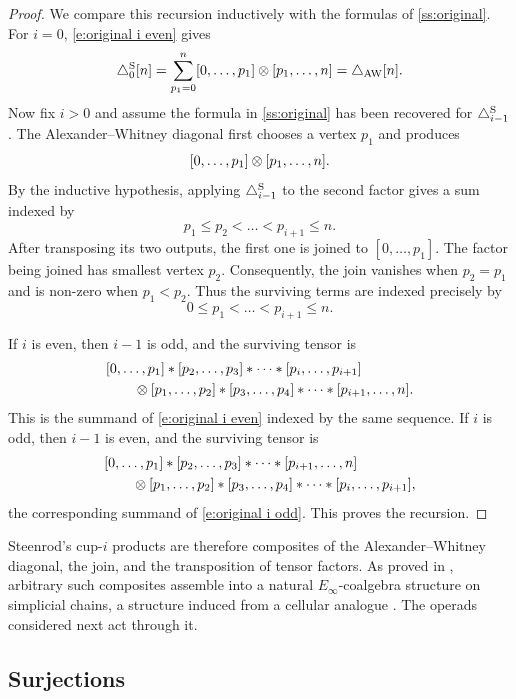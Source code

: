 \begin{proof}
	We compare this recursion inductively with the formulas of \cref{ss:original}.
	For $i=0$, \cref{e:original i even} gives
	\[
		\triangle^{\mathrm{S}}_0[n]
		=
		\sum_{p_1=0}^{n}
		[0,\dots,p_1] \otimes [p_1,\dots,n]
		=
		\triangle_{{\mathrm{AW}}}[n].
	\]
	Now fix $i>0$ and assume the formula in \cref{ss:original} has been recovered for $\triangle^{\mathrm{S}}_{i-1}$.
	The Alexander--Whitney diagonal first chooses a vertex $p_1$ and produces
	\[
		[0,\dots,p_1] \otimes [p_1,\dots,n].
	\]
	By the inductive hypothesis, applying $\triangle^{\mathrm{S}}_{i-1}$ to the second factor gives a sum indexed by
	\[
		p_1 \leq p_2 < \dots < p_{i+1} \leq n.
	\]
	After transposing its two outputs, the first one is joined to $[0,\dots,p_1]$.
	The factor being joined has smallest vertex $p_2$.
	Consequently, the join vanishes when $p_2=p_1$ and is non-zero when $p_1<p_2$.
	Thus the surviving terms are indexed precisely by
	\[
		0 \leq p_1 < \dots < p_{i+1} \leq n.
	\]

	If $i$ is even, then $i-1$ is odd, and the surviving tensor is
	\[
	\begin{split}
		&[0,\dots,p_1] \ast [p_2,\dots,p_3] \ast \dots \ast [p_i,\dots,p_{i+1}] \\
		&\qquad \otimes
		[p_1,\dots,p_2] \ast [p_3,\dots,p_4] \ast \dots \ast [p_{i+1},\dots,n].
	\end{split}
	\]
	This is the summand of \cref{e:original i even} indexed by the same sequence.
	If $i$ is odd, then $i-1$ is even, and the surviving tensor is
	\[
	\begin{split}
		&[0,\dots,p_1] \ast [p_2,\dots,p_3] \ast \dots \ast [p_{i+1},\dots,n] \\
		&\qquad \otimes
		[p_1,\dots,p_2] \ast [p_3,\dots,p_4] \ast \dots \ast [p_i,\dots,p_{i+1}],
	\end{split}
	\]
	the corresponding summand of \cref{e:original i odd}.
	This proves the recursion.
\end{proof}

Steenrod's \mbox{cup-$i$} products are therefore composites of the Alexander--Whitney diagonal, the join, and the transposition of tensor factors.
As proved in \cite{medina2020prop1}, arbitrary such composites assemble into a natural $E_\infty$-coalgebra structure on simplicial chains, a structure induced from a cellular analogue \cite{medina2021prop2}.
The operads considered next act through it.

\subsection{Surjections}\label{ss:surjections}

